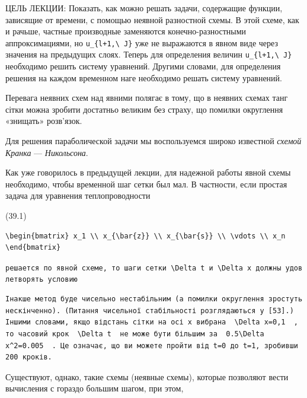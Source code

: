 \documentclass[
  ukrainian,
]{article}
\begin{document}
ЦЕЛЬ ЛЕКЦИИ: Показать, как можно решать задачи, содержащие функции,
зависящие от времени, с помощью неявной разностной схемы. В этой схеме,
как и рачьше, частные производные заменяются конечно-разностными
аппроксимациями, но \texttt{u\_\{l+1,\textbackslash{}\ J\}} уже не
выражаются в явном виде через значения на предыдущих слоях. Теперь для
определения величин \texttt{u\_\{l+1,\textbackslash{}\ J\}} необходимо
решить систему уравнений. Другими словами, для определения решения на
каждом временном наге необходимо решать систему уравнений.

Перевага неявних схем над явними полягає в тому, що в неявних схемах
танг сітки можна зробити достатньо великим без страху, що помилки
округлення «знищать» розв'язок.

Для решения параболической задачи мы воспользуемся широко известной
\emph{схемой Кранка} --- \emph{Никольсона}.

Как уже говорилось в предыдущей лекции, для надежной работы явной схемы
необходимо, чтобы временной шаг сетки был мал. В частности, если простая
задача для уравнения теплопроводности

(39.1)

\begin{verbatim}
\begin{bmatrix} x_1 \\ x_{\bar{z}} \\ x_{\bar{s}} \\ \vdots \\ x_n \end{bmatrix}
\end{verbatim}

\texttt{решается\ по\ явной\ схеме,\ то\ шаги\ сетки\ \textquotesingle{}\textbackslash{}Delta\ t\textquotesingle{}\ и\ \textquotesingle{}\textbackslash{}Delta\ x\textquotesingle{}\ должны\ удовлетворять\ условию}

\begin{verbatim}
Інакше метод буде чисельно нестабільним (а помилки округлення зростуть нескінченно). (Питання чисельної стабільності розглядаються у [53].) Іншими словами, якщо відстань сітки на осі x вибрана  \Delta x=0,1  , то часовий крок  \Delta t  не може бути більшим за  0.5\Delta x^2=0.005  . Це означає, що ви можете пройти від t=0 до t=1, зробивши 200 кроків.
\end{verbatim}

Существуют, однако, такие схемы (неявные схемы), которые позволяют вести
вычисления с гораздо большим шагом, при этом,
\end{document}
